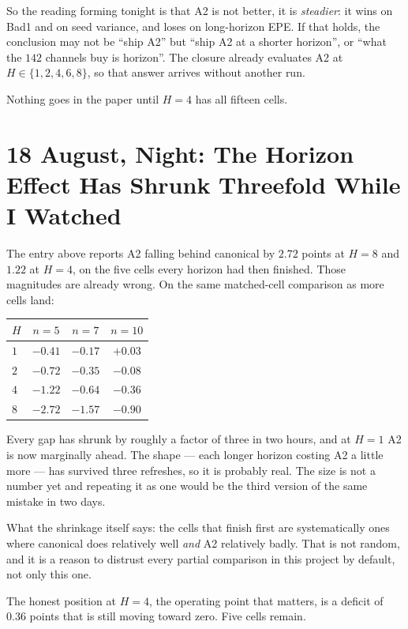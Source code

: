 \documentclass[11pt,a4paper]{article}
\begin{document}
So the reading forming tonight is that A2 is not better, it is \emph{steadier}:
it wins on Bad1 and on seed variance, and loses on long-horizon EPE. If that
holds, the conclusion may not be ``ship A2'' but ``ship A2 at a shorter
horizon'', or ``what the $142$ channels buy is horizon''. The closure already
evaluates A2 at $H\in\{1,2,4,6,8\}$, so that answer arrives without another run.

Nothing goes in the paper until $H{=}4$ has all fifteen cells.


\section*{18 August, Night: The Horizon Effect Has Shrunk Threefold While I Watched}

The entry above reports A2 falling behind canonical by $2.72$ points at $H{=}8$
and $1.22$ at $H{=}4$, on the five cells every horizon had then finished. Those
magnitudes are already wrong. On the same matched-cell comparison as more cells
land:

\begin{center}
\begin{tabular}{lccc}
\toprule
$H$ & $n{=}5$ & $n{=}7$ & $n{=}10$ \\
\midrule
$1$ & $-0.41$ & $-0.17$ & $+0.03$ \\
$2$ & $-0.72$ & $-0.35$ & $-0.08$ \\
$4$ & $-1.22$ & $-0.64$ & $-0.36$ \\
$8$ & $-2.72$ & $-1.57$ & $-0.90$ \\
\bottomrule
\end{tabular}
\end{center}

Every gap has shrunk by roughly a factor of three in two hours, and at $H{=}1$ A2
is now marginally ahead. The shape --- each longer horizon costing A2 a little
more --- has survived three refreshes, so it is probably real. The size is not a
number yet and repeating it as one would be the third version of the same
mistake in two days.

What the shrinkage itself says: the cells that finish first are systematically
ones where canonical does relatively well \emph{and} A2 relatively badly. That is
not random, and it is a reason to distrust every partial comparison in this
project by default, not only this one.

The honest position at $H{=}4$, the operating point that matters, is a deficit of
$0.36$ points that is still moving toward zero. Five cells remain.
\end{document}
